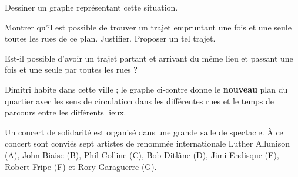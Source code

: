 \documentclass[]{prof}
\begin{document}
\medskip
\begin{enumerate} 
  \item Dessiner un graphe représentant cette situation.
  \item Montrer qu'il est possible de trouver un trajet empruntant une fois et une seule toutes les rues de ce plan. Justifier. Proposer un tel trajet.
  
  Est-il possible d'avoir un trajet partant et arrivant du même lieu et passant une fois et une seule par toutes les rues ?
  
  
  \begin{minipage}[b]{0,3\textwidth}
  \item
   Dimitri habite dans cette ville ; le graphe ci-contre  donne le  \textbf{nouveau} plan du quartier avec les sens de circulation dans les différentes rues et le temps de parcours entre les différents lieux.
  \end{minipage}
  \hspace{1cm}
  \begin{minipage}[c]{0,68\textwidth}
  \end{minipage}
\end{enumerate}

\vfill\newpage\null 


Un concert de solidarité est organisé dans une grande salle de spectacle. À ce concert sont conviés sept artistes de renommée internationale Luther Allunison (A), John Biaise (B), Phil Colline (C), Bob Ditlâne (D), Jimi Endisque (E), Robert Fripe (F) et Rory Garaguerre (G).
\end{document}
